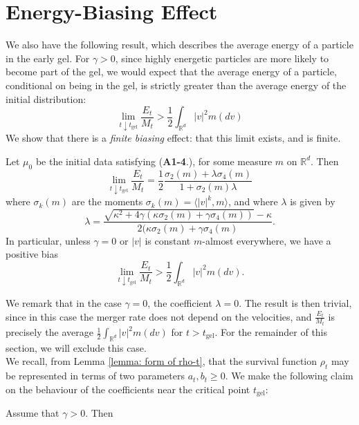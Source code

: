 \section{Energy-Biasing Effect} 
We also have the following result, which describes the average energy of a particle in the early gel. For $\gamma >0$, since highly energetic particles are more likely to become part of the gel, we would expect that the average energy of a particle, conditional on being in the gel, is strictly greater than the average energy of the initial distribution: \begin{equation}
    \lim_{t\downarrow t_\text{gel}}\frac{E_t}{M_t}>\frac{1}{2}\int_{\mathbb{R}^d}|v|^2m(dv)
\end{equation} We show that there is a \emph{finite biasing} effect: that this limit exists, and is finite. 
\begin{theorem} Let $\mu_0$ be the initial data satisfying (\textbf{A1-4}.), for some measure $m$ on $\mathbb{R}^d$. Then \begin{equation}
    \lim_{t\downarrow t_\text{gel}}\frac{E_t}{M_t}=\frac{1}{2}\frac{\sigma_2(m)+\lambda\sigma_4(m)}{1+\sigma_2(m)\lambda}
\end{equation} where $\sigma_k(m)$ are the moments $\sigma_k(m)=\langle |v|^k, m\rangle$, and where $\lambda$ is given by \begin{equation} \lambda=\frac{\sqrt{\kappa^2+4\gamma(\kappa\sigma_2(m)+\gamma \sigma_4(m))}-\kappa}{2(\kappa\sigma_2(m)+\gamma\sigma_4(m)}.\end{equation} In particular, unless $\gamma=0$ or $|v|$ is constant $m$-almost everywhere, we have a positive bias \begin{equation}
    \lim_{t\downarrow t_\text{gel}}\frac{E_t}{M_t}>\frac{1}{2}\int_{\mathbb{R}^d}|v|^2m(dv).
\end{equation} \end{theorem}  We remark that in the case $\gamma=0$, the coefficient $\lambda=0$. The result is then trivial, since in this case the merger rate does not depend on the velocities, and $\frac{E_t}{M_t}$ is precisely the average $\frac{1}{2}\int_{\mathbb{R}^d}|v|^2m(dv)$ for $t>t_\text{gel}$. For the remainder of this section, we will exclude this case. \medskip \\We recall, from Lemma \ref{lemma: form of rho-t}, that the survival function $\rho_t$ may be represented in terms of two parameters $a_t, b_t \ge 0$. We make the following claim on the behaviour of the coefficients near the critical point $t_\text{gel}$: \begin{lemma}\label{lemma: a and b}Assume that $\gamma>0$. Then \begin{enumerate}[label=\roman{*}).]

\end{enumerate}
\end{lemma}
